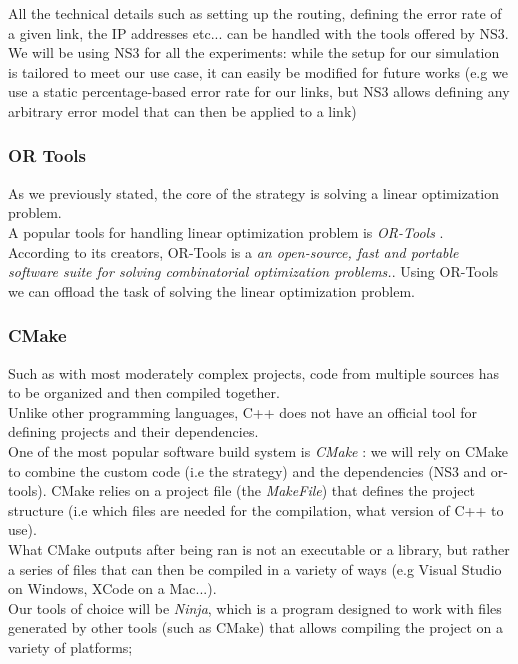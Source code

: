 All the technical details such as setting up the routing, defining the error rate of a given link, the IP addresses etc... can be handled with the tools offered by NS3. \\

We will be using NS3 for all the experiments: while the setup for our simulation is tailored to meet our use case, it can easily be modified for future works (e.g we use a static percentage-based error rate for our links, but NS3 allows defining any arbitrary error model that can then be applied to a link)


\subsubsection{OR Tools}
As we previously stated, the core of the strategy is solving a linear optimization problem. \\
A popular tools for handling linear optimization problem is \textit{OR-Tools} \cite{or-tools}. \\
According to its creators, OR-Tools is a \textit{an open-source, fast and portable software suite for solving combinatorial optimization problems.}.
Using OR-Tools we can offload the task of solving the linear optimization problem.

\subsubsection{CMake}
Such as with most moderately complex projects, code from multiple sources has to be organized and then compiled together. \\ 
Unlike other programming languages, C++ does not have an official tool for defining projects and their dependencies.\\
One of the most popular software build system is \textit{CMake} \cite{cmake}: we will rely on CMake to combine the custom code (i.e the strategy) and the dependencies (NS3 and or-tools).
CMake relies on a project file (the \textit{MakeFile}) that defines the project structure (i.e which files are needed for the compilation, what version of C++ to use). \\
What CMake outputs after being ran is not an executable or a library, but rather a series of files that can then be compiled in a variety of ways (e.g Visual Studio on Windows, XCode on a Mac...). \\
Our tools of choice will be \textit{Ninja}, which is a program designed to work with files generated by other tools (such as CMake) that allows compiling the project on a variety of platforms;
 \\

